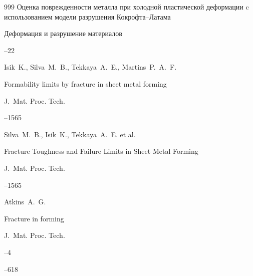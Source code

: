 \begin{thebibliography}{999}
\paper Оценка поврежденности металла при холодной пластической деформации c использованием модели разрушения Кокрофта–Латама

\jour Деформация и разрушение материалов



--22




\by Isik~K., Silva~M.~B., Tekkaya~A.~E., Martins~P.~A.~F. 

\paper Formability limits by fracture in sheet metal forming

\jour J.~Mat. Proc. Tech.  




--1565






\by Silva~M.~B., Isik~K., Tekkaya~A.~E. et al.

\paper Fracture Toughness and Failure Limits in Sheet Metal Forming

\jour J.~Mat. Proc. Tech.  




--1565






\by  Atkins~A.~G. 

\paper Fracture in forming  

\jour J.~Mat. Proc. Tech.



--4

--618




	



\end{thebibliography}

